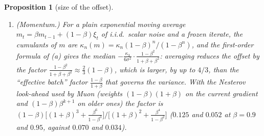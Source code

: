 \documentclass[11pt]{article}
\newtheorem{proposition}[theorem]{Proposition}
\theoremstyle{definition}
\theoremstyle{remark}
\begin{document}
\begin{proposition}[size of the offset]
\begin{enumerate}[label=(\alph*)]
is smaller than for sign descent by a factor of order $d$, and the nuclear norm of the offset stays between $1$ and
$2.3$ times the scalar offset for the sizes of the table (it decreases for very wide matrices: $3\sqrt d/(d+2)$ for
$K=1$), against $Kd$ times for the $\ell_1$ norm of the offset of sign descent.
\item (Momentum.) For a plain exponential moving average $m_t=\beta m_{t-1}+(1-\beta)\xi_t$ of i.i.d.\ scalar noise and
a frozen iterate, the cumulants of $m$ are $\kappa_n(m)=\kappa_n(1-\beta)^n/(1-\beta^n)$, and the first-order formula of
(a) gives the median $-\frac{\kappa_3}{6\sigma^2}\cdot\frac{1-\beta^2}{1+\beta+\beta^2}$: averaging reduces the offset by
the factor $\frac{1-\beta^2}{1+\beta+\beta^2}\approx\frac23(1-\beta)$, which is larger, by up to $4/3$, than the
``effective batch'' factor $\frac{1-\beta}{1+\beta}$ that governs the variance. With the Nesterov look-ahead used by Muon
(weights $(1-\beta)(1+\beta)$ on the current gradient and $(1-\beta)\beta^{k+1}$ on older ones) the factor is
$(1-\beta)\big[(1+\beta)^3+\frac{\beta^6}{1-\beta^3}\big]\big/\big[(1+\beta)^2+\frac{\beta^4}{1-\beta^2}\big]$ ($0.125$ and
$0.052$ at $\beta=0.9$ and $0.95$, against $0.070$ and $0.034$).
\end{enumerate}
\end{proposition}
\end{document}
